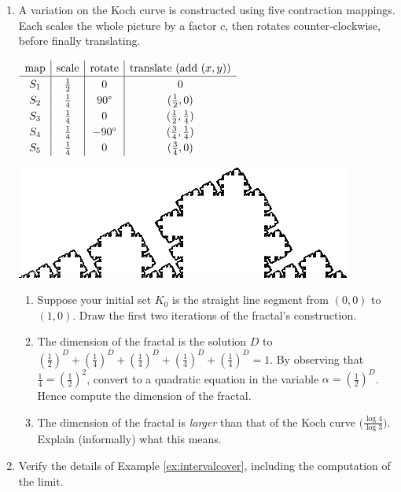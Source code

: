 \begin{exercises}
\begin{enumerate}
		\item A variation on the Koch curve is constructed using five contraction mappings. Each scales the whole picture by a factor $c$, then rotates counter-clockwise, before finally translating.\par  
	  \begin{minipage}{0.52\linewidth}
		  \qquad$\displaystyle\def\arraystretch{1.2}
		  \begin{array}{c|c|c|c}
			  \text{map}&\text{scale}&\text{rotate}&\text{translate (add $(x,y)$)}\\\hline
			  S_1&\frac 12&0&0\\
			  S_2&\frac 14&\ang{90}&(\frac 12,0)\\
			  S_3&\frac 14&0&(\frac 12,\frac 14)\\
			  S_4&\frac 14&-\ang{90}&(\frac 34,\frac 14)\\
			  S_5&\frac 14&0&(\frac 34,0)
		  \end{array}$
	  \end{minipage}
	  \hfill
	  \begin{minipage}{0.47\linewidth}
	  	\flushright\includegraphics{fractal}
	  \end{minipage}\par
	  \begin{enumerate}
	    \item Suppose your initial set $K_0$ is the straight line segment from $(0,0)$ to $(1,0)$. Draw the first two iterations of the fractal's construction.
	    \item The dimension of the fractal is the solution $D$ to $(\frac 12)^D+(\frac 14)^D+(\frac 14)^D+(\frac 14)^D+(\frac 14)^D=1$. By observing that $\frac 14=\left(\frac 12\right)^2$, convert to a quadratic equation in the variable $\alpha=(\frac 12)^D$. Hence compute the dimension of the fractal.
	    \item The dimension of the fractal is \emph{larger} than that of the Koch curve $\bigl(\frac{\log 4}{\log 3}\bigr)$. Explain (informally) what this means.
	  \end{enumerate}
	
	
		\item Verify the details of Example \ref{ex:intervalcover}, including the computation of the limit.
	

\end{enumerate}
\end{exercises}
